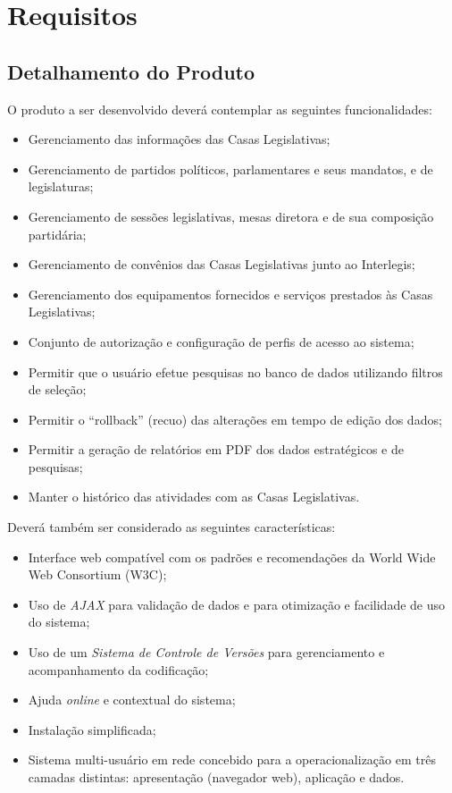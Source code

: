 %
%

\section{Requisitos}
\label{sec:requisitos}

\subsection{Detalhamento do Produto}
O produto a ser desenvolvido deverá contemplar as seguintes
funcionalidades:

\begin{itemize}
\item Gerenciamento das informações das Casas Legislativas;
\item Gerenciamento de partidos políticos, parlamentares e seus
  mandatos, e de legislaturas;
\item Gerenciamento de sessões legislativas, mesas diretora e de sua
  composição partidária;
\item Gerenciamento de convênios das Casas Legislativas junto ao
  Interlegis;
\item Gerenciamento dos equipamentos fornecidos e serviços prestados
  às Casas Legislativas;
\item Conjunto de autorização e configuração de perfis de acesso ao
  sistema;
\item Permitir que o usuário efetue pesquisas no banco de dados
  utilizando filtros de seleção;
\item Permitir o ``rollback'' (recuo) das alterações em tempo de
  edição dos dados;
\item Permitir a geração de relatórios em PDF dos dados estratégicos e
  de pesquisas;
\item Manter o histórico das atividades com as Casas Legislativas.
\end{itemize}

Deverá também ser considerado as seguintes características:

\begin{itemize}
\item Interface web compatível com os padrões e recomendações da World
  Wide Web Consortium (W3C);
\item Uso de \emph{AJAX} para validação de dados e para otimização e
  facilidade de uso do sistema;
\item Uso de um \emph{Sistema de Controle de Versões} para gerenciamento e
  acompanhamento da codificação;
\item Ajuda \textit{online} e contextual do sistema;
\item Instalação simplificada;
\item Sistema multi-usuário em rede concebido para a operacionalização
  em três camadas distintas: apresentação (navegador web), aplicação e
  dados.
\end{itemize}

